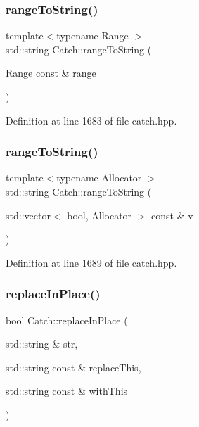 \mbox{\label{namespace_catch_af13494e925a793e3e7143c6ce6f442c2}} 
\subsubsection{rangeToString()\hspace{0.1cm}{\footnotesize\ttfamily [1/2]}}
{\footnotesize\ttfamily template$<$typename Range $>$ \\
std\+::string Catch\+::range\+To\+String (\begin{DoxyParamCaption}\item[{Range const \&}]{range }\end{DoxyParamCaption})}



Definition at line 1683 of file catch.\+hpp.

\mbox{\label{namespace_catch_ae162dc66b7767a52e7e4283915fd3d9f}} 
\subsubsection{rangeToString()\hspace{0.1cm}{\footnotesize\ttfamily [2/2]}}
{\footnotesize\ttfamily template$<$typename Allocator $>$ \\
std\+::string Catch\+::range\+To\+String (\begin{DoxyParamCaption}\item[{std\+::vector$<$ bool, Allocator $>$ const \&}]{v }\end{DoxyParamCaption})}



Definition at line 1689 of file catch.\+hpp.

\mbox{\label{namespace_catch_afe4e6770da547e43e9e4eeaa05f946ea}} 
\subsubsection{replaceInPlace()}
{\footnotesize\ttfamily bool Catch\+::replace\+In\+Place (\begin{DoxyParamCaption}\item[{std\+::string \&}]{str,  }\item[{std\+::string const \&}]{replace\+This,  }\item[{std\+::string const \&}]{with\+This }\end{DoxyParamCaption})}

